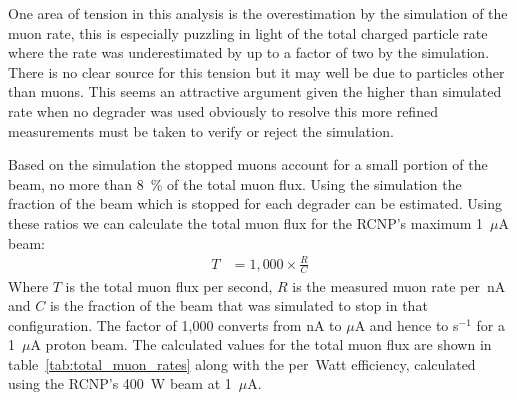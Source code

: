 One area of tension in this analysis is the overestimation by the simulation of the muon rate, this is especially puzzling in light of the total charged particle rate where the rate was underestimated by up to a factor of two by the simulation. There is no clear source for this tension but it may well be due to particles other than muons. This seems an attractive argument given the higher than simulated rate when no degrader was used obviously to resolve this more refined measurements must be taken to verify or reject the simulation.

Based on the simulation the stopped muons account for a small portion of the beam, no more than 8~\% of the total muon flux. Using the simulation the fraction of the beam which is stopped for each degrader can be estimated. Using these ratios we can calculate the total muon flux for the RCNP's maximum 1~\(\mu\)A beam:
\begin{align}\label{equ:total_rate}
  T &= 1,000\times\frac{R}{C}
\end{align}
Where \(T\) is the total muon flux per second, \(R\) is the measured muon rate per~nA and \(C\) is the fraction of the beam that was simulated to stop in that configuration. The factor of 1,000 converts from nA to \(\mu\)A and hence to s\(^{-1}\) for a 1~\(\mu\)A proton beam. The calculated values for the total muon flux are shown in table~\ref{tab:total_muon_rates} along with the per~Watt efficiency, calculated using the RCNP's 400~W beam at 1~\(\mu\)A.


